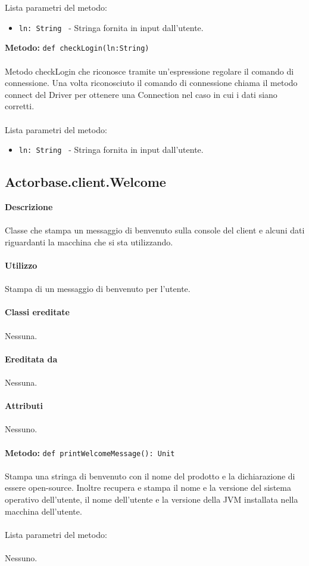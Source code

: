 \documentclass[a4paper]{article}
\begin{document}
			\\ \\
			Lista parametri del metodo:
			\begin{itemize}
				\item \texttt{ln: String } - Stringa fornita in input dall'utente.
			\end{itemize}
			\textbf{Metodo: }\texttt{def checkLogin(ln:String)}
			\\ \\
			Metodo checkLogin che riconosce tramite un'espressione regolare il comando di connessione. Una volta riconosciuto il comando di connessione chiama il metodo connect del Driver per ottenere una Connection nel caso in cui i dati siano corretti.
			\\ \\
			Lista parametri del metodo:
			\begin{itemize}
				\item \texttt{ln: String } - Stringa fornita in input dall'utente.
			\end{itemize}
			
	\subsection{Actorbase.client.Welcome}	
		\textbf{Descrizione}
			\\ \\
			Classe che stampa un messaggio di benvenuto sulla console del client e alcuni dati riguardanti la macchina che si sta utilizzando.
			\\ \\
		\textbf{Utilizzo}
			\\ \\
			Stampa di un messaggio di benvenuto per l'utente.
			\\ \\
		\textbf{Classi ereditate}
			\\ \\
			Nessuna.
			\\ \\
		\textbf{Ereditata da}
			\\ \\
			Nessuna.
			\\ \\
		\textbf{Attributi}
			\\ \\
			Nessuno.
			\\ \\
			\textbf{Metodo: }\texttt{def printWelcomeMessage(): Unit}
			\\ \\
			Stampa una stringa di benvenuto con il nome del prodotto e la dichiarazione di essere open-source. Inoltre recupera e stampa il nome e la versione del sistema operativo dell'utente, il nome dell'utente e la versione della JVM installata nella macchina dell'utente.
			\\ \\
			Lista parametri del metodo:
			\\ \\
				Nessuno.
			\\ \\
			
\end{document}
